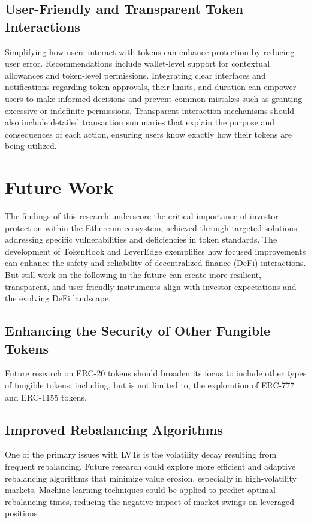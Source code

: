 \subsection{User-Friendly and Transparent Token Interactions}
Simplifying how users interact with tokens can enhance protection by reducing user error. Recommendations include wallet-level support for contextual allowances and token-level permissions. Integrating clear interfaces and notifications regarding token approvals, their limits, and duration can empower users to make informed decisions and prevent common mistakes such as granting excessive or indefinite permissions. Transparent interaction mechanisms should also include detailed transaction summaries that explain the purpose and consequences of each action, ensuring users know exactly how their tokens are being utilized. 

\section{Future Work}
The findings of this research underscore the critical importance of investor protection within the Ethereum ecosystem, achieved through targeted solutions addressing specific vulnerabilities and deficiencies in token standards. The development of TokenHook and LeverEdge exemplifies how focused improvements can enhance the safety and reliability of decentralized finance (DeFi) interactions. But still work on the following in the future can create more resilient, transparent, and user-friendly instruments align with investor expectations and the evolving DeFi landscape.

\subsection{Enhancing the Security of Other Fungible Tokens}
Future research on ERC-20 tokens should broaden its focus to include other types of fungible tokens, including, but is not limited to, the exploration of ERC-777 and ERC-1155 tokens.

\subsection{Improved Rebalancing Algorithms}
One of the primary issues with LVTs is the volatility decay resulting from frequent rebalancing. Future research could explore more efficient and adaptive rebalancing algorithms that minimize value erosion, especially in high-volatility markets. Machine learning techniques could be applied to predict optimal rebalancing times, reducing the negative impact of market swings on leveraged positions

